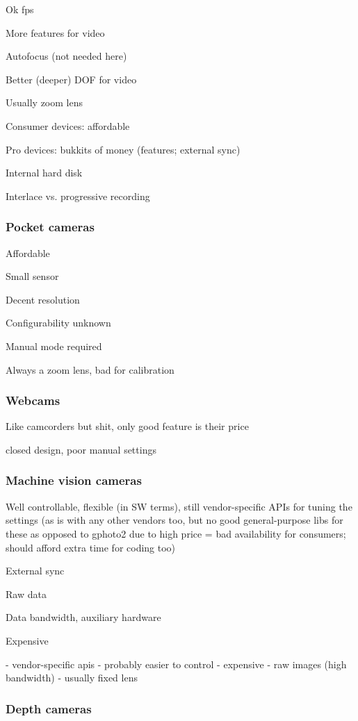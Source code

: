 Ok fps

More features for video

Autofocus (not needed here)

Better (deeper) DOF for video

Usually zoom lens

Consumer devices: affordable

Pro devices: bukkits of money (features; external sync)

Internal hard disk

Interlace vs. progressive recording

\subsubsection{Pocket cameras}

Affordable

Small sensor

Decent resolution

Configurability unknown

Manual mode required

Always a zoom lens, bad for calibration

\subsubsection{Webcams}

Like camcorders but shit, only good feature is their price

closed design, poor manual settings

\subsubsection{Machine vision cameras}

Well controllable, flexible (in SW terms), still vendor-specific APIs for tuning the settings (as is with any other vendors too, but no good general-purpose libs for these as opposed to gphoto2 due to high price = bad availability for consumers; should afford extra time for coding too)

External sync

Raw data

Data bandwidth, auxiliary hardware

Expensive

- vendor-specific apis
- probably easier to control
- expensive
- raw images (high bandwidth)
- usually fixed lens
\subsubsection{Depth cameras}

